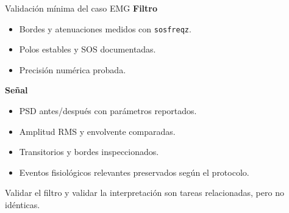 \documentclass[
  ignorenonframetext,
  aspectratio=169,
  spanish,
  professionalfonts]{beamer}
\providecommand{\tightlist}{%
  \setlength{\itemsep}{0pt}\setlength{\parskip}{0pt}}
\begin{document}
\begin{frame}[fragile]{Validación mínima del caso EMG}
\protect{}\label{validaciuxf3n-muxednima-del-caso-emg}
\textbf{Filtro}

\begin{itemize}
\tightlist
\item
  Bordes y atenuaciones medidos con \texttt{sosfreqz}.
\item
  Polos estables y SOS documentadas.
\item
  Precisión numérica probada.
\end{itemize}

\textbf{Señal}

\begin{itemize}
\tightlist
\item
  PSD antes/después con parámetros reportados.
\item
  Amplitud RMS y envolvente comparadas.
\item
  Transitorios y bordes inspeccionados.
\item
  Eventos fisiológicos relevantes preservados según el protocolo.
\end{itemize}

\begin{tcolorbox}[enhanced jigsaw, arc=.35mm, bottomrule=.15mm, bottomtitle=1mm, breakable, colback=white, colbacktitle=quarto-callout-note-color!10!white, colframe=quarto-callout-note-color-frame, coltitle=black, left=2mm, leftrule=.75mm, opacityback=0, opacitybacktitle=0.6, rightrule=.15mm, title={Regla}, titlerule=0mm, toprule=.15mm, toptitle=1mm]

Validar el filtro y validar la interpretación son tareas relacionadas,
pero no idénticas.

\end{tcolorbox}
\end{frame}
\end{document}

